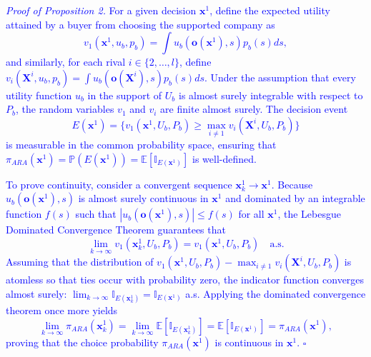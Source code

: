 \documentclass[a4paper,fleqn, 11pt]{cas-sc}
\newenvironment{proof}[1][Proof]{\noindent\textit{#1.} }{\hfill$\square$\par\medskip}
\begin{document}
\textcolor{blue}{\begin{proof}[Proof of Proposition 2]
For a given decision $\bm{x}^1$, define the expected utility attained by a buyer from choosing the supported company as
\begin{equation*}
    v_1(\bm{x}^1, u_b, p_b) = \int u_b(\bm{o}(\bm{x}^1), s) p_b(s) ds,
\end{equation*}
and similarly, for each rival $i \in \{2, \ldots, l\}$, define $v_i(\bm{X}^i, u_b, p_b) = \int u_b(\bm{o}(\bm{X}^i), s) p_b(s) ds$. Under the assumption that every utility function $u_b$ in the support of $U_b$ is almost surely integrable with respect to $P_b$, the random variables $v_1$ and $v_i$ are finite almost surely. The decision event
\begin{equation*}
    E(\bm{x}^1) = \Big\{ v_1(\bm{x}^1, U_b, P_b) \geq \max_{i \neq 1} v_i(\bm{X}^i, U_b, P_b) \Big\}
\end{equation*}
is measurable in the common probability space, ensuring that $\pi_{ARA}(\bm{x}^1) = \mathbb{P}(E(\bm{x}^1)) = \mathbb{E}[\mathbb{I}_{E(\bm{x}^1)}]$ is well-defined.

To prove continuity, consider a convergent sequence $\bm{x}_k^1 \to \bm{x}^1$. Because $u_b(\bm{o}(\bm{x}^1), s)$ is almost surely continuous in $\bm{x}^1$ and dominated by an integrable function $f(s)$ such that $|u_b(\bm{o}(\bm{x}^1), s)| \leq f(s)$ for all $\bm{x}^1$, the Lebesgue Dominated Convergence Theorem guarantees that
\begin{equation*}
    \lim_{k \to \infty} v_1(\bm{x}_k^1, U_b, P_b) = v_1(\bm{x}^1, U_b, P_b) \quad \text{a.s.}
\end{equation*}
Assuming that the distribution of $v_1(\bm{x}^1, U_b, P_b) - \max_{i \neq 1} v_i(\bm{X}^i, U_b, P_b)$ is atomless so that ties occur with probability zero, the indicator function converges almost surely: $\lim_{k \to \infty} \mathbb{I}_{E(\bm{x}_k^1)} = \mathbb{I}_{E(\bm{x}^1)}$ a.s. Applying the dominated convergence theorem once more yields
\begin{equation*}
    \lim_{k \to \infty} \pi_{ARA}(\bm{x}_k^1) = \lim_{k \to \infty} \mathbb{E}[\mathbb{I}_{E(\bm{x}_k^1)}] = \mathbb{E}[\mathbb{I}_{E(\bm{x}^1)}] = \pi_{ARA}(\bm{x}^1),
\end{equation*}
proving that the choice probability $\pi_{ARA}(\bm{x}^1)$ is continuous in $\bm{x}^1$.
\end{proof}}


\printcredits




\end{document}
